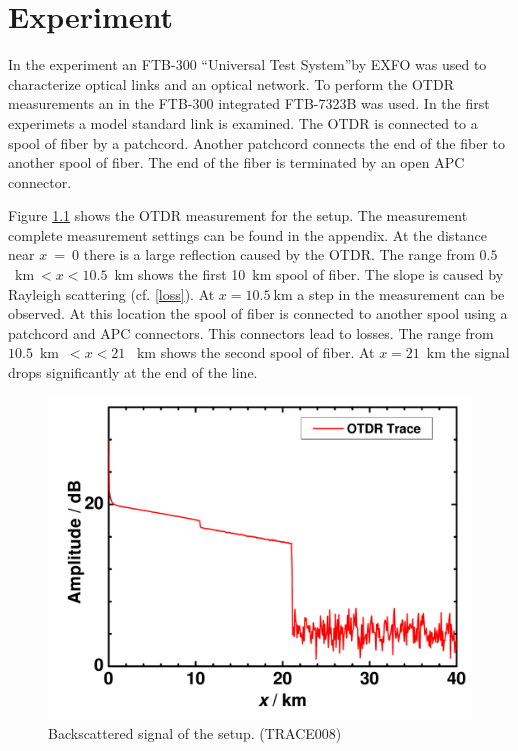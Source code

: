 \chapter{Experiment}
\label{ch:exp}
In the experiment an FTB-300 ``Universal Test System''by EXFO was used to characterize optical links and an optical network. To perform the OTDR measurements an in the FTB-300 integrated FTB-7323B was used. In the first experimets a model standard link is examined. The OTDR is connected to a spool of fiber by a patchcord. Another patchcord connects the end of the fiber to another spool of fiber. The end of the fiber is terminated by an open APC connector. 

Figure \ref{fig:1_line} shows the OTDR measurement for the setup. The measurement complete measurement settings can be found in the appendix.
At the distance near $x$~=~0 there is a large reflection caused by the OTDR. The range from $ 0.5$~km$~ < x < 10.5$~km shows the first 10~km spool of fiber. The slope is caused by Rayleigh scattering (cf. {\ref{loss}}). At $x = 10.5~$km a step in the measurement can be observed. At this location the spool of fiber is connected to another spool using a patchcord and APC connectors. This connectors lead to losses. 
The range from $10.5$~km~$ < x < 21$
~km shows the second spool of fiber. At $x = 21$~km the signal drops significantly at the end of the line.


\begin{figure}[h]%
\centering
\includegraphics[width=.6\columnwidth]{grafiken/1_line.pdf}%
\caption{Backscattered signal of the setup. (TRACE008)}%
\label{fig:1_line}%
\end{figure}
\newpage


